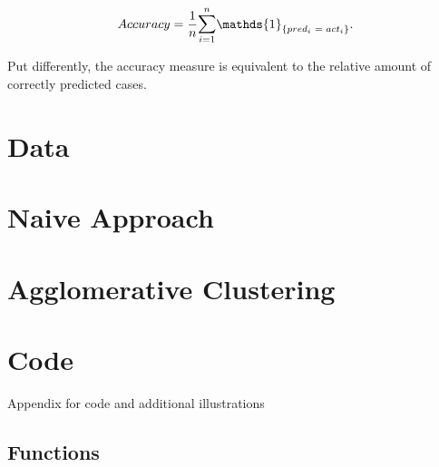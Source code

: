 \documentclass[aodsor,preprint]{imsart}
\numberwithin{equation}{section}
\theoremstyle{plain}
\begin{document}
\[
Accuracy = \frac{1}{n}\mathlarger{\sum}_{i = 1}^n\mathds{1}_{\{pred_i \text{ }= \text{ } act_i\}}\text{.}
\]

Put differently, the accuracy measure is equivalent to the relative amount of correctly predicted cases.

\section{Data}

\section{Naive Approach}

\section{Agglomerative Clustering}
\newpage

\appendix


\section{Code}
\label{sec:app}

Appendix for code and additional illustrations

\subsection{Functions}






\newpage
\printbibliography
\end{document}
